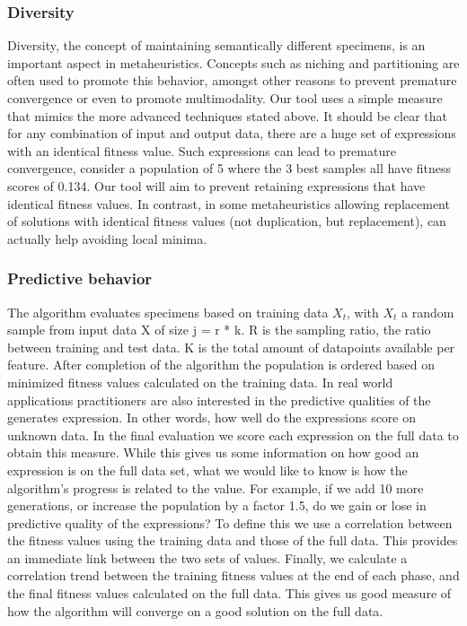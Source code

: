 \subsubsection{Diversity}\label{subsubdiversity}
Diversity, the concept of maintaining semantically different specimens, is an important aspect in metaheuristics. Concepts such as niching and partitioning are often used to promote this behavior, amongst other reasons to prevent premature convergence or even to promote multimodality.
Our tool uses a simple measure that mimics the more advanced techniques stated above. It should be clear that for any combination of input and output data, there are a huge set of expressions with an identical fitness value. Such expressions can lead to premature convergence, consider a population of 5 where the 3 best samples all have fitness scores of 0.134. Our tool will aim to prevent retaining expressions that have identical fitness values.
In contrast, in some metaheuristics \cite{DE} allowing replacement of solutions with identical fitness values (not duplication, but replacement), can actually help avoiding local minima. 

\subsubsection{Predictive behavior}
The algorithm evaluates specimens based on training data $X_t$, with $X_t$ a random sample from input data X of size j = r * k. R is the sampling ratio, the ratio between training and test data. K is the total amount of datapoints available per feature. 
After completion of the algorithm the population is ordered based on minimized fitness values calculated on the training data. 
In real world applications practitioners are also interested in the predictive qualities of the generates expression. In other words, how well do the expressions score on unknown data. In the final evaluation we score each expression on the full data to obtain this measure. 
While this gives us some information on how good an expression is on the full data set, what we would like to know is how the algorithm's progress is related to the value. For example, if we add 10 more generations, or increase the population by a factor 1.5, do we gain or lose in predictive quality of the expressions? To define this we use a correlation between the fitness values using the training data and those of the full data. 
This provides an immediate link between the two sets of values. 
Finally, we calculate a correlation trend between the training fitness values at the end of each phase, and the final fitness values calculated on the full data. This gives us good measure of how the algorithm will converge on a good solution on the full data. 

